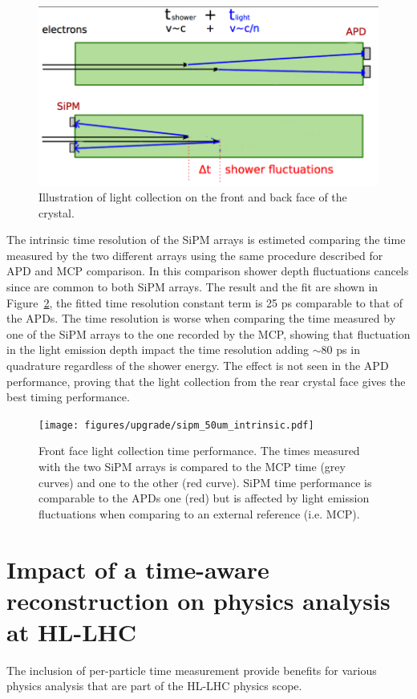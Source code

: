 \begin{figure}[h!]
  \centering
  \includegraphics[width = .6\textwidth]{figures/upgrade/shower_fluct_cartoon.png}
  \caption{Illustration of light collection on the front and back face of the \PbWO crystal.}
  \label{fig:light_collection_scheme}
\end{figure}

The intrinsic time resolution of the SiPM arrays is estimeted comparing the time measured by the two different arrays using
the same procedure described for APD and MCP comparison. In this comparison shower depth fluctuations cancels since
are common to both SiPM arrays.
The result and the fit are shown in Figure~\ref{fig:sipm_tres},
the fitted time resolution constant term is 25 ps comparable to that of the APDs.
The time resolution is worse when comparing the time measured by one of the SiPM arrays to the one recorded by the MCP,
showing that fluctuation in the light emission depth impact the time resolution adding $\sim 80$ ps in quadrature regardless
of the shower energy. The effect is not seen in the APD performance, proving that the light collection from the rear crystal
face gives the best timing performance.

\begin{figure}[h!]
  \centering
  \texttt{[image: figures/upgrade/sipm\_50um\_intrinsic.pdf]}
  \caption{Front face light collection time performance. The times measured with the two SiPM arrays
    is compared to the MCP time (grey curves) and one to the other (red curve). SiPM time performance is comparable
    to the APDs one (red) but is affected by light emission fluctuations when comparing to an external
    reference (i.e. MCP).}
  \label{fig:sipm_tres}
\end{figure}

\section{Impact of a time-aware reconstruction on physics analysis at HL-LHC}
The inclusion of per-particle time measurement provide benefits for various physics analysis that are part of
the HL-LHC physics scope.

